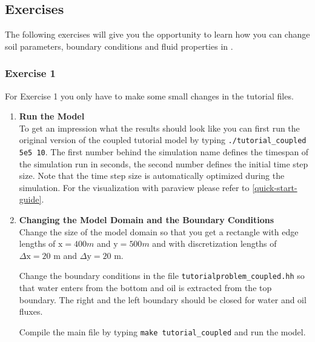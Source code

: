 \subsection{Exercises}
\label{tutorial-coupled:exercises}
The following exercises will give you the opportunity to learn how you
can change soil parameters, boundary conditions and fluid properties
in \Dumux. 

\subsubsection{Exercise 1}
\renewcommand{\labelenumi}{\alph{enumi})} For Exercise 1 you only have
to make some small changes in the tutorial files.  

\begin{enumerate}

\item \textbf{Run the Model} \\
To get an impression what the results should look like you can first run the original version of the coupled tutorial model by typing  \texttt{./tutorial\_coupled 5e5 10}. The first number behind the simulation name defines the timespan of the simulation run in seconds, the second number defines the initial time step size. Note that the time step size is automatically optimized during the simulation. For the visualization with paraview please refer to \ref{quick-start-guide}.\\

\item \textbf{Changing the Model Domain and the Boundary Conditions} \\
  Change the size of the model domain so that you get a rectangle with
  edge lengths of $\text{x} = 400 m$ and $\text{y} = 500 m$ and with
  discretization lengths of $\Delta \text{x} = 20$ m and $\Delta
  \text{y} = 20$ m.
  
  Change the boundary conditions in the file
  \texttt{tutorialproblem\_coupled.hh} so that water enters from the
  bottom and oil is extracted from the top boundary. The right and the
  left boundary should be closed for water and oil fluxes. 

  Compile the main file by typing \texttt{make tutorial\_coupled} and
  run the model.



\end{enumerate}
